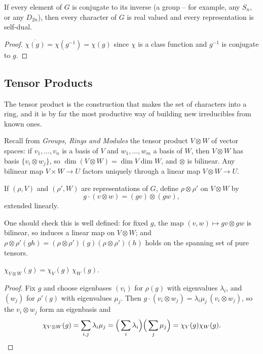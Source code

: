 \begin{proposition}
	If every element of $G$ is conjugate to its inverse (a  group -- for example, any $S_n$, or any $D_{2n}$), then every character of $G$ is real valued and every representation is self-dual.
\end{proposition}
\begin{proof}
	$\overline{\chi(g)} = \chi(g^{-1}) = \chi(g)$ since $\chi$ is a class function and $g^{-1}$ is conjugate to $g$.
\end{proof}

\subsection{Tensor Products}

The tensor product is the construction that makes the set of characters into a ring, and it is by far the most productive way of building new irreducibles from known ones.

Recall from \emph{Groups, Rings and Modules} the tensor product $V \otimes W$ of vector spaces: if $v_1,\dots,v_n$ is a basis of $V$ and $w_1,\dots,w_m$ a basis of $W$, then $V\otimes W$ has basis $\{v_i\otimes w_j\}$, so $\dim(V\otimes W) = \dim V\dim W$, and $\otimes$ is bilinear. Any bilinear map $V \times W \to U$ factors uniquely through a linear map $V \otimes W \to U$.

\begin{definition}
	If $(\rho, V)$ and $(\rho', W)$ are representations of $G$, define $\rho\otimes\rho'$ on $V\otimes W$ by
	$$g\cdot(v\otimes w) = (gv)\otimes(gw),$$
	extended linearly.
\end{definition}

One should check this is well defined: for fixed $g$, the map $(v,w)\mapsto gv\otimes gw$ is bilinear, so induces a linear map on $V \otimes W$; and $\rho\otimes\rho'(gh) = (\rho\otimes\rho')(g)(\rho\otimes\rho')(h)$ holds on the spanning set of pure tensors.

\begin{proposition}
	$\chi_{V\otimes W}(g) = \chi_V(g)\,\chi_W(g)$.
\end{proposition}
\begin{proof}
	Fix $g$ and choose eigenbases $(v_i)$ for $\rho(g)$ with eigenvalues $\lambda_i$, and $(w_j)$ for $\rho'(g)$ with eigenvalues $\mu_j$. Then $g\cdot(v_i\otimes w_j) = \lambda_i\mu_j\,(v_i\otimes w_j)$, so the $v_i\otimes w_j$ form an eigenbasis and
	$$\chi_{V\otimes W}(g) = \sum_{i,j}\lambda_i\mu_j = \Big(\sum_i\lambda_i\Big)\Big(\sum_j\mu_j\Big) = \chi_V(g)\chi_W(g). \qedhere$$
\end{proof}

